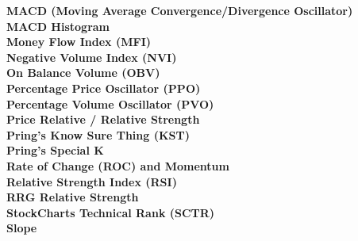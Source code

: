 \documentclass[12pt,a4paper]{article}
\begin{document}
\textbf{MACD (Moving Average Convergence/Divergence Oscillator)} \\

\iffalse
[]
\fi

\textbf{MACD Histogram} \\

\iffalse
[]
\fi

\textbf{Money Flow Index (MFI)} \\

\iffalse
[]
\fi

\textbf{Negative Volume Index (NVI)} \\

\iffalse
[]
\fi

\textbf{On Balance Volume (OBV)} \\

\iffalse
[]
\fi

\textbf{Percentage Price Oscillator (PPO)} \\

\iffalse
[]
\fi

\textbf{Percentage Volume Oscillator (PVO)} \\

\iffalse
[]
\fi

\textbf{Price Relative / Relative Strength} \\

\iffalse
[]
\fi

\textbf{Pring's Know Sure Thing (KST)} \\

\iffalse
[]
\fi

\textbf{Pring's Special K} \\

\iffalse
[]
\fi

\textbf{Rate of Change (ROC) and Momentum} \\

\iffalse
[]
\fi

\textbf{Relative Strength Index (RSI)} \\

\iffalse
[]
\fi

\textbf{RRG Relative Strength} \\

\iffalse
[]
\fi

\textbf{StockCharts Technical Rank (SCTR)} \\

\iffalse
[]
\fi

\textbf{Slope} \\
\end{document}
